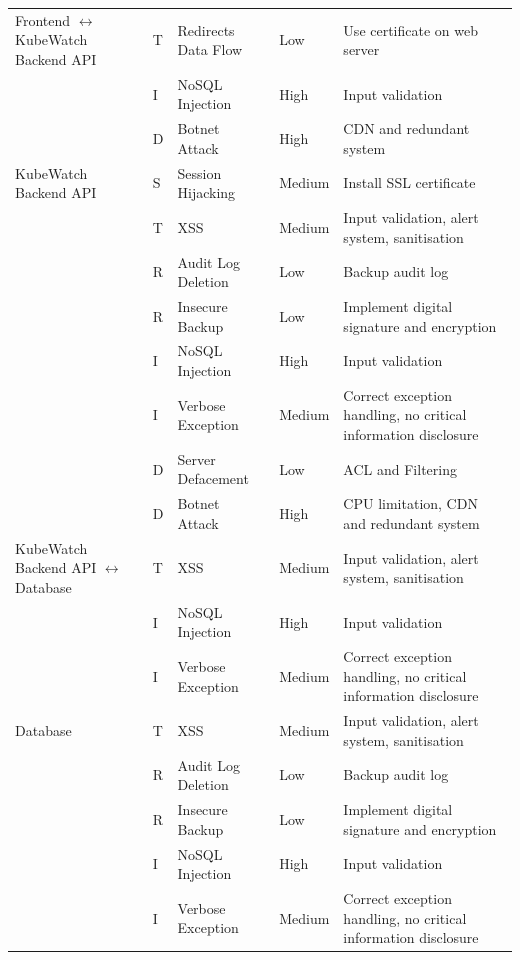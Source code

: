 \begin{longtable}[h!]{p{2.1cm} p{1.8cm} p{3cm} p{2cm} p{3.5cm}}
    \hline
    Frontend  \(\leftrightarrow\) KubeWatch Backend API
                        & T & Redirects Data Flow & Low & Use certificate on web server \\
                        & I & NoSQL Injection & High & Input validation \\
                        & D & Botnet Attack & High & CDN and redundant system \\
    \hline
    KubeWatch Backend API
                        & S & Session Hijacking & Medium & Install SSL certificate \\
                        & T & XSS & Medium & Input validation, alert system, sanitisation \\
                        & R & Audit Log Deletion & Low & Backup audit log \\
                        & R & Insecure Backup & Low & Implement digital signature and encryption \\
                        & I & NoSQL Injection & High & Input validation \\
                        & I & Verbose Exception & Medium & Correct exception handling, no critical information disclosure \\
                        & D & Server Defacement & Low & ACL and Filtering \\
                        & D & Botnet Attack & High & CPU limitation, CDN and redundant system \\
    \hline
    KubeWatch Backend API \(\leftrightarrow\) Database
                        & T & XSS & Medium & Input validation, alert system, sanitisation \\
                        & I & NoSQL Injection & High & Input validation \\
                        & I & Verbose Exception & Medium & Correct exception handling, no critical information disclosure \\
    \hline
    Database            & T & XSS & Medium & Input validation, alert system, sanitisation \\
                        & R & Audit Log Deletion & Low & Backup audit log \\
                        & R & Insecure Backup & Low & Implement digital signature and encryption \\
                        & I & NoSQL Injection & High & Input validation \\
                        & I & Verbose Exception & Medium & Correct exception handling, no critical information disclosure \\

\end{longtable}
